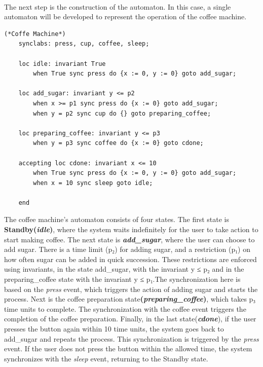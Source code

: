 \paragraph{}

The next step is the construction of the automaton. In this case, a single automaton will be developed to represent the operation of the coffee machine.

\begin{lstlisting}[language=UPPAAL]
    (*Coffe Machine*)
    synclabs: press, cup, coffee, sleep;

    loc idle: invariant True
    	when True sync press do {x := 0, y := 0} goto add_sugar;
    
    loc add_sugar: invariant y <= p2
    	when x >= p1 sync press do {x := 0} goto add_sugar;
    	when y = p2 sync cup do {} goto preparing_coffee;
    
    loc preparing_coffee: invariant y <= p3
    	when y = p3 sync coffee do {x := 0} goto cdone;
    
    accepting loc cdone: invariant x <= 10
    	when True sync press do {x := 0, y := 0} goto add_sugar;
    	when x = 10 sync sleep goto idle;
    
    end
\end{lstlisting}


The coffee machine's automaton consists of four states. The first state is \textbf{Standby(\textit{idle})}, where the system waits indefinitely for the user to take action to start making coffee. The next state is \textbf{\textit{add\_sugar}}, where the user can choose to add sugar. There is a time limit (p₂) for adding sugar, and a restriction (p₁) on how often sugar can be added in quick succession. These restrictions are enforced using invariants, in the state add\_sugar, with the invariant y ≤ p₂ and in the preparing\_coffee state with the invariant y ≤ p₁.The synchronization here is based on the \textit{press} event, which triggers the action of adding sugar and starts the process. Next is the coffee preparation state\textbf{(\textit{preparing\_coffee})}, which takes p₃ time units to complete. The synchronization with the coffee event triggers the completion of the coffee preparation. Finally, in the last state(\textbf{\textit{cdone}}), if the user presses the button again within 10 time units, the system goes back to add\_sugar and repeats the process. This synchronization is triggered by the \textit{press} event. If the user does not press the button within the allowed time, the system synchronizes with the \textit{sleep} event, returning to the Standby state.

